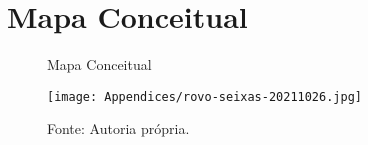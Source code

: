 
\chapter{Mapa Conceitual}
\label{Append:diagele}

\begin{figure} [h]	
    \centering
    \caption{Mapa Conceitual}
    \texttt{[image: Appendices/rovo-seixas-20211026.jpg]}
    \caption*{Fonte: Autoria própria.}
    \label{fig:mapac}
\end{figure}
